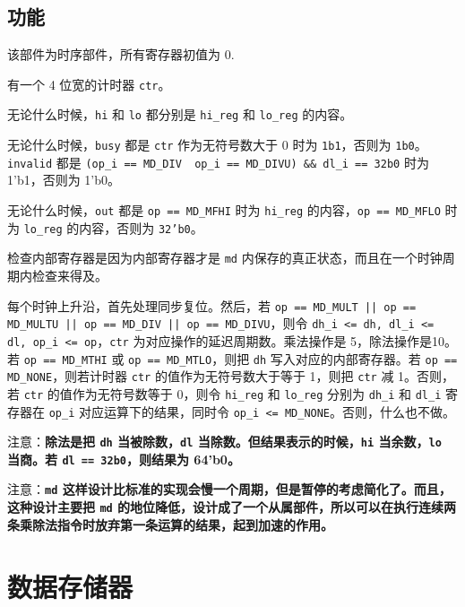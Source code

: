 \documentclass[12pt,AutoFakeBold,AutoFakeSlant]{article}
\begin{document}
\hypertarget{ux529fux80fd-8}{%
\subsection{功能}\label{ux529fux80fd-8}}

该部件为时序部件，所有寄存器初值为 0.

有一个 4 位宽的计时器 \texttt{ctr}。

无论什么时候，\texttt{hi} 和 \texttt{lo} 都分别是 \texttt{hi\_reg} 和
\texttt{lo\_reg} 的内容。

无论什么时候，\texttt{busy} 都是 \texttt{ctr} 作为无符号数大于 0 时为 \texttt{1\textquotesingle{}b1}，否则为
\texttt{1\textquotesingle{}b0}。\texttt{invalid} 都是
\texttt{(op\_i\ ==\ MD\_DIV\ \textbar{}\textbar{}\ op\_i\ ==\ MD\_DIVU)\ \&\&\ dl\_i\ ==\ 32\textquotesingle{}b0} 时为 1'b1，否则为 1'b0。

无论什么时候，\texttt{out} 都是 \texttt{op == MD\_MFHI} 时为 \texttt{hi\_reg} 的内容，\texttt{op == MD\_MFLO} 时为 \texttt{lo\_reg} 的内容，否则为 \texttt{32'b0}。

检查内部寄存器是因为内部寄存器才是 \texttt{md} 内保存的真正状态，而且在一个时钟周期内检查来得及。

每个时钟上升沿，首先处理同步复位。然后，若 \texttt{op == MD\_MULT || op == MD\_MULTU || op == MD\_DIV || op == MD\_DIVU}，则令 \texttt{dh\_i <= dh, dl\_i <= dl, op\_i <= op}，\texttt{ctr} 为对应操作的延迟周期数。乘法操作是 5，除法操作是10。若 \texttt{op == MD\_MTHI} 或 \texttt{op == MD\_MTLO}，则把 \texttt{dh} 写入对应的内部寄存器。若 \texttt{op == MD\_NONE}，则若计时器 \texttt{ctr} 的值作为无符号数大于等于 1，则把 \texttt{ctr} 减 1。否则，若 \texttt{ctr} 的值作为无符号数等于 0，则令 \texttt{hi\_reg} 和 \texttt{lo\_reg} 分别为 \texttt{dh\_i} 和 \texttt{dl\_i} 寄存器在 \texttt{op\_i} 对应运算下的结果，同时令 \texttt{op\_i <= MD\_NONE}。否则，什么也不做。


注意：\textbf{除法是把 \texttt{dh} 当被除数，\texttt{dl}
当除数。但结果表示的时候，\texttt{hi} 当余数，\texttt{lo} 当商。若
\texttt{dl\ ==\ 32\textquotesingle{}b0}，则结果为 64'b0。}

注意：\textbf{\texttt{md} 这样设计比标准的实现会慢一个周期，但是暂停的考虑简化了。而且，这种设计主要把 \texttt{md} 的地位降低，设计成了一个从属部件，所以可以在执行连续两条乘除法指令时放弃第一条运算的结果，起到加速的作用。}

\hypertarget{ux6570ux636eux5b58ux50a8ux5668}{%
\section{数据存储器}\label{ux6570ux636eux5b58ux50a8ux5668}}
\end{document}
